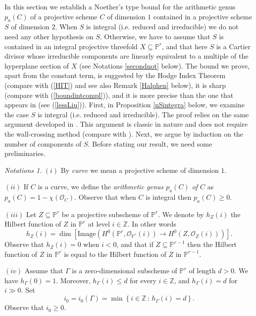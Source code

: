 \documentclass[9pt,a4paper]{amsart}
\theoremstyle{plain}
\theoremstyle{definition}
\theoremstyle{remark}
\newtheorem{notations}[theorem]{Notations}
\begin{document}
In this section we establish a Noether's type bound for the arithmetic
genus $p_a(C)$ of a projective scheme $C$ of dimension $1$ contained
in a projective scheme $S$ of dimension $2$. When $S$ is integral
(i.e. reduced and irreducible) we do not need any other hypothesis
on $S$. Otherwise, we have to assume that $S$ is contained in an
integral projective threefold $X\subseteq \mathbb P^r$, and that here $S$
is a Cartier divisor whose irreducible components are linearly
equivalent to a multiple of the hyperplane section of $X$ (see
Notations \ref{secondnot} below). The bound we prove, apart from the
constant term, is suggested by the Hodge Index Theorem (compare with
(\ref{HIT}) and see also Remark \ref{Halphen} below), it is sharp (compare with (\ref{boundintcompl})),
and it is more precise than the one that appears in \cite[Corollary 4.4]{Liu}  (see (\ref{lessLiu})).
First, in Proposition \ref{nSintegra} below, we examine the case $S$
is integral (i.e. reduced and irreducible). The proof relies on the
same argument developed in \cite[Lemma]{D3}.
This argument is classic in nature and does not require the wall-crossing method
(compare with \cite[Proof of Proposition 4.3]{Liu}).
Next, we argue by induction on the number of components of $S$.
Before stating our
result, we need some preliminaries.

\smallskip
\begin{notations}\label{primenotazioni}
$(i)$ By {\it curve} we mean  a projective scheme of dimension $1$.

\smallskip
$(ii)$ If $C$ is a curve, we define the {\it arithmetic genus
$p_a(C)$ of $C$} as $p_a(C)=1-\chi(\mathcal O_C)$. Observe that when
$C$ is integral then $p_a(C)\geq 0$.

\smallskip
$(iii)$ Let $Z\subseteq \mathbb P^r$ be a projective subscheme of
$\mathbb P^r$. We denote by $h_Z(i)$ the Hilbert function of $Z$ in
$\mathbb P^r$ at level $i\in \mathbb Z$. In other words
$$
h_Z(i)=\dim\left[{\text{Image}} \left(H^0(\mathbb P^r,\mathcal
O_{\mathbb P^r}(i))\to H^0(Z,\mathcal O_{Z}(i))\right)\right].
$$
Observe that $h_{Z}(i)=0$ when $i<0$, and that if $Z\subseteq
\mathbb P^{r-1}$ then the Hilbert function of $Z$ in $\mathbb P^r$
is equal to the Hilbert function of $Z$ in $\mathbb P^{r-1}$.

\smallskip
$(iv)$ Assume that  $\Gamma$ is a zero-dimensional subscheme of
$\mathbb P^r$ of length $d>0$. We have $h_{\Gamma}(0)=1$. Moreover,
$h_{\Gamma}(i)\leq d$ for every $i\in\mathbb Z$, and
$h_{\Gamma}(i)=d$ for $i\gg 0$. Set
$$
i_0=i_0(\Gamma)=\min\left\{i\in\mathbb Z\,:\,
h_{\Gamma}(i)=d\right\}.
$$
Observe that $i_0\geq 0$.
\end{notations}
\end{document}
